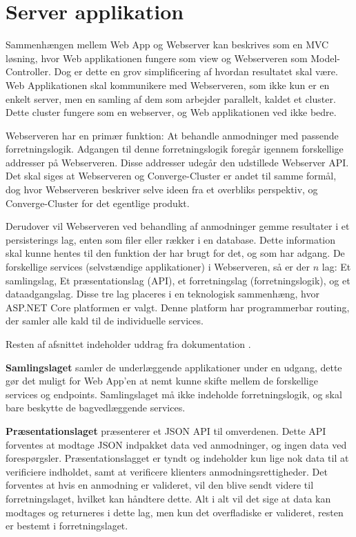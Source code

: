 
\section{Server applikation}

Sammenhængen mellem Web App og Webserver kan beskrives som en MVC løsning, hvor Web applikationen fungere som view og Webserveren som Model-Controller. Dog er dette en grov simplificering af hvordan resultatet skal være. Web Applikationen skal kommunikere med Webserveren, som ikke kun er en enkelt server, men en samling af dem som arbejder parallelt, kaldet et cluster. Dette cluster fungere som en webserver, og Web applikationen ved ikke bedre.

Webserveren har en primær funktion: At behandle anmodninger med passende forretningslogik. Adgangen til denne forretningslogik foregår igennem forskellige addresser på Webserveren. Disse addresser udegår den udstillede Webserver API. Det skal siges at Webserveren og Converge-Cluster er andet til samme formål, dog hvor Webserveren beskriver selve ideen fra et overbliks perspektiv, og Converge-Cluster for det egentlige produkt. 

Derudover vil Webserveren ved behandling af anmodninger gemme resultater i et persisterings lag, enten som filer eller rækker i en database. Dette information skal kunne hentes til den funktion der har brugt for det, og som har adgang. De forskellige services (selvstændige applikationer) i Webserveren, så er der $n$ lag: Et samlingslag, Et præsentationslag (API), et forretningslag (forretningslogik), og et dataadgangslag. Disse tre lag placeres i en teknologisk sammenhæng, hvor ASP.NET Core platformen er valgt. Denne platform har programmerbar routing, der samler alle kald til de individuelle services.


Resten af afsnittet indeholder uddrag fra dokumentation .

\textbf{Samlingslaget} samler de underlæggende applikationer under en udgang, dette gør det muligt for Web App'en at nemt kunne skifte mellem de forskellige services og endpoints. Samlingslaget må ikke indeholde forretningslogik, og skal bare beskytte de bagvedlæggende services.

\textbf{Præsentationslaget} præsenterer et JSON API til omverdenen. Dette API forventes at modtage JSON indpakket data ved anmodninger, og ingen data ved forespørgsler. Præsentationslagget er tyndt og indeholder kun lige nok data til at verificiere indholdet, samt at verificere klienters anmodningsrettigheder. Det forventes at hvis en anmodning er valideret, vil den blive sendt videre til forretningslaget, hvilket kan håndtere dette. Alt i alt vil det sige at data kan modtages og returneres i dette lag, men kun det overfladiske er valideret, resten er bestemt i forretningslaget.

